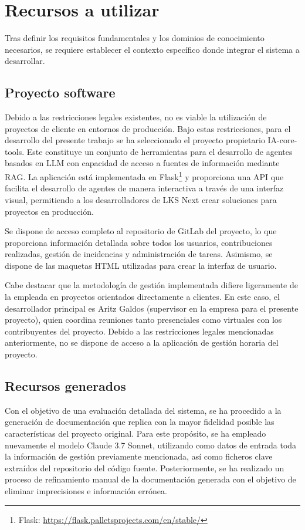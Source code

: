\section{Recursos a utilizar}
Tras definir los requisitos fundamentales y los dominios de conocimiento necesarios, se requiere establecer el contexto específico donde integrar el sistema a desarrollar. 
\subsection{Proyecto software}

Debido a las restricciones legales existentes, no es viable la utilización de proyectos de cliente en entornos de producción. Bajo estas restricciones, para el desarrollo del presente trabajo se ha seleccionado el proyecto propietario IA-core-tools. Este constituye un conjunto de herramientas para el desarrollo de agentes basados en LLM con capacidad de acceso a fuentes de información mediante RAG. La aplicación está implementada en Flask\footnote{Flask: \url{https://flask.palletsprojects.com/en/stable/}} y proporciona una API que facilita el desarrollo de agentes de manera interactiva a través de una interfaz visual, permitiendo a los desarrolladores de LKS Next crear soluciones para proyectos en producción.

Se dispone de acceso completo al repositorio de GitLab del proyecto, lo que proporciona información detallada sobre todos los usuarios, contribuciones realizadas, gestión de incidencias y administración de tareas. Asimismo, se dispone de las maquetas HTML utilizadas para crear la interfaz de usuario. 

Cabe destacar que la metodología de gestión implementada difiere ligeramente de la empleada en proyectos orientados directamente a clientes. En este caso, el desarrollador principal es Aritz Galdos (supervisor en la empresa para el presente proyecto), quien coordina reuniones tanto presenciales como virtuales con los contribuyentes del proyecto. Debido a las restricciones legales mencionadas anteriormente, no se dispone de acceso a la aplicación de gestión horaria del proyecto.

\subsection{Recursos generados}
Con el objetivo de una evaluación detallada del sistema, se ha procedido a la generación de documentación que replica con la mayor fidelidad posible las características del proyecto original. Para este propósito, se ha empleado nuevamente el modelo Claude 3.7 Sonnet, utilizando como datos de entrada toda la información de gestión previamente mencionada, así como ficheros clave extraídos del repositorio del código fuente. Posteriormente, se ha realizado un proceso de refinamiento manual de la documentación generada con el objetivo de eliminar imprecisiones e información errónea.

